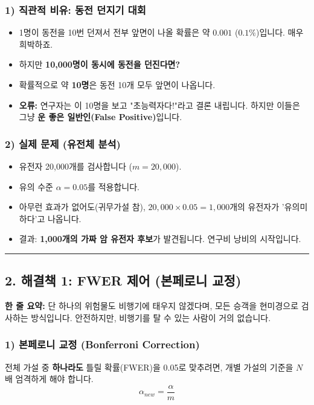 \documentclass[11pt,a4paper]{book}
\theoremstyle{definition}
\begin{document}
\subsubsection*{1) 직관적 비유: 동전 던지기 대회}
\begin{itemize}
    \item 1명이 동전을 10번 던져서 전부 앞면이 나올 확률은 약 $0.001$ ($0.1\%$)입니다. 매우 희박하죠.
    \item 하지만 \textbf{10,000명이 동시에 동전을 던진다면?}
    \item 확률적으로 약 \textbf{10명}은 동전 10개 모두 앞면이 나옵니다.
    \item \textbf{오류:} 연구자는 이 10명을 보고 "초능력자다!"라고 결론 내립니다. 하지만 이들은 그냥 \textbf{운 좋은 일반인(False Positive)}입니다.
\end{itemize}

\subsubsection*{2) 실제 문제 (유전체 분석)}
\begin{itemize}
    \item 유전자 20,000개를 검사합니다 ($m=20,000$).
    \item 유의 수준 $\alpha = 0.05$를 적용합니다.
    \item 아무런 효과가 없어도(귀무가설 참), $20,000 \times 0.05 = 1,000$개의 유전자가 '유의미하다'고 나옵니다.
    \item 결과: \textbf{1,000개의 가짜 암 유전자 후보}가 발견됩니다. 연구비 낭비의 시작입니다.
\end{itemize}

\vspace{0.5cm}\hrule\vspace{0.5cm}

\subsection{2. 해결책 1: FWER 제어 (본페로니 교정)}

\begin{conceptbox}[title={개념 2: 철통 보안 검색대}]
\textbf{한 줄 요약:} 단 하나의 위험물도 비행기에 태우지 않겠다며, 모든 승객을 현미경으로 검사하는 방식입니다. 안전하지만, 비행기를 탈 수 있는 사람이 거의 없습니다.
\end{conceptbox}

\subsubsection*{1) 본페로니 교정 (Bonferroni Correction)}
전체 가설 중 \textbf{하나라도} 틀릴 확률(FWER)을 0.05로 맞추려면, 개별 가설의 기준을 $N$배 엄격하게 해야 합니다.
$$ \alpha_{new} = \frac{\alpha}{m} $$
\end{document}
